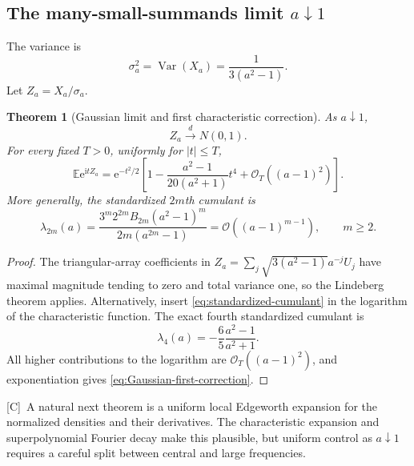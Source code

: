\documentclass[11pt,oneside]{article}
\newtheorem{theorem}{Theorem}[section]
\theoremstyle{definition}
\theoremstyle{remark}
\newcommand{\e}{\mathrm e}
\newcommand{\ii}{\mathrm i}
\newcommand{\Var}{\operatorname{Var}}
\newcommand{\E}{\mathbb E}
\newcommand{\bigO}{\mathcal O}
\newcommand{\Cmark}{\textcolor{conjecturered}{\textsf{[C]}}}
\begin{document}
\subsection{The many-small-summands limit $a\downarrow1$}

The variance is
\begin{equation}
 \sigma_a^2=\Var(X_a)=\frac1{3(a^2-1)}.
 \label{eq:variance-a}
\end{equation}
Let $Z_a=X_a/\sigma_a$.

\begin{theorem}[Gaussian limit and first characteristic correction]
\label{thm:gaussian-limit}
As $a\downarrow1$,
\begin{equation}
 Z_a\xrightarrow{\ d\ }N(0,1).
 \label{eq:Gaussian-limit}
\end{equation}
For every fixed $T>0$, uniformly for $|t|\le T$,
\begin{equation}
 \E\e^{\ii tZ_a}
 =\e^{-t^2/2}\left[
 1-\frac{a^2-1}{20(a^2+1)}t^4
 +\bigO_T((a-1)^2)
 \right].
 \label{eq:Gaussian-first-correction}
\end{equation}
More generally, the standardized $2m$th cumulant is
\begin{equation}
 \lambda_{2m}(a)=
 \frac{3^m2^{2m}B_{2m}(a^2-1)^m}{2m(a^{2m}-1)}
 =\bigO((a-1)^{m-1}),\qquad m\ge2.
 \label{eq:standardized-cumulant}
\end{equation}
\end{theorem}

\begin{proof}
The triangular-array coefficients in
$Z_a=\sum_j\sqrt{3(a^2-1)}a^{-j}U_j$ have maximal magnitude tending to zero and total
variance one, so the Lindeberg theorem applies.  Alternatively, insert
\eqref{eq:standardized-cumulant} in the logarithm of the characteristic function.  The exact
fourth standardized cumulant is
\begin{equation}
 \lambda_4(a)=-\frac65\frac{a^2-1}{a^2+1}.
 \label{eq:lambda4}
\end{equation}
All higher contributions to the logarithm are $\bigO_T((a-1)^2)$, and exponentiation gives
\eqref{eq:Gaussian-first-correction}.
\end{proof}

\Cmark\ A natural next theorem is a uniform local Edgeworth expansion for the normalized
densities and their derivatives.  The characteristic expansion and superpolynomial Fourier
decay make this plausible, but uniform control as $a\downarrow1$ requires a careful split
between central and large frequencies.
\end{document}
